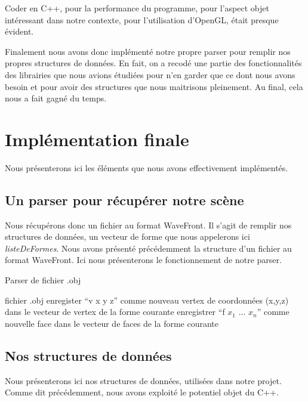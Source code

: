 \documentclass[a4paper,12pt]{report}
\begin{document}
Coder en C++, pour la performance du programme, pour l'aspect objet intéressant dans notre contexte, pour l'utilisation d'OpenGL, était presque évident.

Finalement nous avons donc implémenté notre propre parser pour remplir nos propres structures de données. En fait, on a recodé une partie des fonctionnalités des librairies que nous avions étudiées pour n'en garder que ce dont nous avons besoin et pour avoir des structures que nous maitrisons pleinement. Au final, cela nous a fait gagné du temps.


\chapter{Implémentation finale}

Nous présenterons ici les éléments que nous avons effectivement implémentés.

\section{Un parser pour récupérer notre scène}

Nous récupérons donc un fichier au format WaveFront. Il s'agit de remplir nos structures de données, un vecteur de forme que nous appelerons ici \textit{listeDeFormes}.
Nous avons présenté précédemment la structure d'un fichier au format WaveFront. Ici nous présenterons le fonctionnement de notre parser.

\begin{algorithm}[t]
\caption{Parser de fichier .obj}
\label{algo_naimi_trehel_init}
\begin{algorithmic}[1]
\REQUIRE fichier .obj
    \STATE enregister ``v x y z'' comme nouveau vertex de coordonnées (x,y,z) dans le vecteur de vertex de la forme courante
  \ELSE
    \STATE enregistrer ``f $x_{1}$ ... $x_{n}$'' comme nouvelle face dans le vecteur de faces de la forme courante
    \ENDIF
  \ENDIF
\ENDFOR
\end{algorithmic}
\end{algorithm}
 

\section{Nos structures de données}

Nous présenterons ici nos structures de données, utilisées dans notre projet. Comme dit précédemment, nous avons exploité le potentiel objet du C++.
\end{document}
